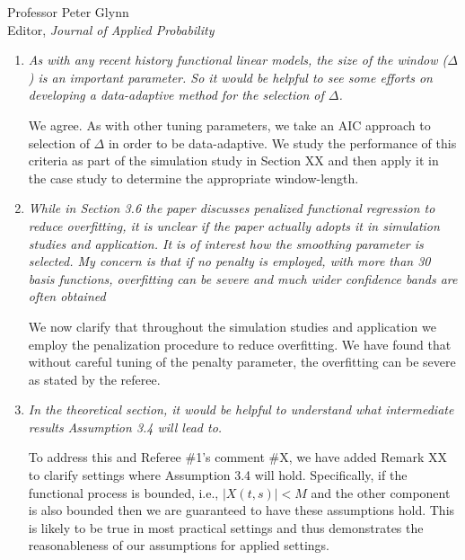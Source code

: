 \documentclass[11pt]{letter} %
\begin{document}
\begin{letter}{Professor
	Peter Glynn\\
	Editor, {\em Journal of Applied Probability}}
\begin{enumerate}
\vspace{5mm}
We now state that our proposed joint model includes a recent history functional linear model which we now link with the previous work by Damla Senturk and others.  This motivates Section XX which provides additional empirical study and discussion of the tuning parameter~$\Delta$.
We added Section XX to describe the related work and connect our methodology to the existing literature.
\vspace{5mm}

\item {\it As with any recent history functional linear models, the size of the window ($\Delta$) is an important parameter. So it would be helpful to see some efforts on developing a data-adaptive method for the selection of $\Delta$.}

\vspace{5mm}
We agree.  As with other tuning parameters, we take an AIC approach to selection of $\Delta$ in order to be data-adaptive.  We study the performance of this criteria as part of the simulation study in Section XX and then apply it in the case study to determine the appropriate window-length.
\vspace{5mm}

\item {\it While in Section 3.6 the paper discusses penalized functional regression to reduce overfitting, it is unclear if the paper actually adopts it in simulation studies and application. It is of interest how the smoothing parameter is selected. My concern is that if no penalty is employed, with more than 30 basis functions, overfitting can be severe and much wider confidence bands are often obtained}

\vspace{5mm}
We now clarify that throughout the simulation studies and application we employ the penalization procedure to reduce overfitting.  We have found that without careful tuning of the penalty parameter, the overfitting can be severe as stated by the referee.
\vspace{5mm}

\item {\it In the theoretical section, it would be helpful to understand what intermediate results Assumption 3.4 will lead to.}

\vspace{5mm}
To address this and Referee \#1's comment \#X, we have added Remark XX to clarify settings where Assumption 3.4 will hold. Specifically, if the functional process is bounded, i.e., $|X(t,s)| < M$ and the other component is also bounded then we are guaranteed to have these assumptions hold.  This is likely to be true in most practical settings and thus demonstrates the reasonableness of our assumptions for applied settings.
\vspace{5mm}


\end{enumerate}
\end{letter}
\end{document}
